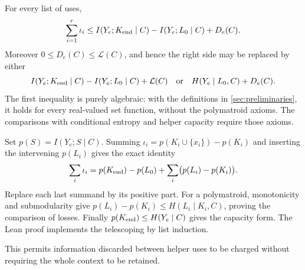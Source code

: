 \begin{lemma}\label{lem:helper-loss}
For every list of uses,
\begin{equation}
\sum_{i=1}^r\iota_i
\le I(Y_e;K_{\rm end}\mid C)-I(Y_e;L_0\mid C)+D_e(C).
\label{eq:helper-potential}
\end{equation}
Moreover $0\le D_e(C)\le\mathcal L(C)$, and hence the right side may
be replaced by either
\[
I(Y_e;K_{\rm end}\mid C)-I(Y_e;L_0\mid C)+\mathcal L(C)
\quad\text{or}\quad H(Y_e\mid L_0,C)+D_e(C).
\]
The first inequality is purely algebraic: with the definitions in
\cref{sec:preliminaries}, it holds for every real-valued set function,
without the polymatroid axioms. The comparisons with conditional
entropy and helper capacity require those axioms.
\end{lemma}
\begin{outline}
Set $p(S)=I(Y_e;S\mid C)$. Summing
$\iota_i=p(K_i\cup\{x_i\})-p(K_i)$ and inserting the intervening
$p(L_i)$ gives the exact identity
\[
\sum_i\iota_i=p(K_{\rm end})-p(L_0)
                  +\sum_i\bigl(p(L_i)-p(K_i)\bigr).
\]
Replace each last summand by its positive part. For a polymatroid,
monotonicity and submodularity give
$p(L_i)-p(K_i)\le H(L_i\mid K_i,C)$, proving the comparison of
losses. Finally $p(K_{\rm end})\le H(Y_e\mid C)$ gives the capacity
form. The Lean proof implements the telescoping by list induction.
\end{outline}
This permits information discarded between helper uses to be charged
without requiring the whole context to be retained.


